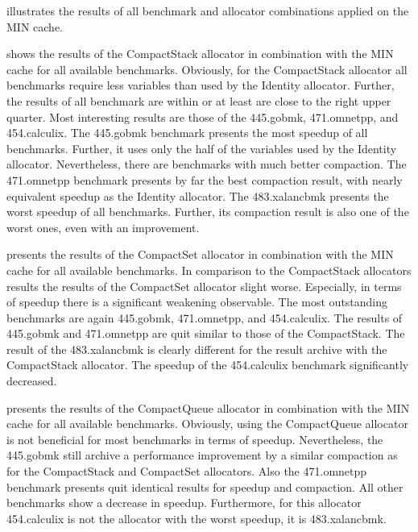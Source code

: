 \documentclass[onecolumn, openright, master, english, signatures]{dbrgrptt}
\begin{document}
 illustrates the results of all benchmark and allocator combinations applied on the \ac{MIN} cache.

 shows the results of the CompactStack allocator in combination with the \ac{MIN} cache for all available benchmarks. Obviously, for the CompactStack allocator all benchmarks require less variables than used by the Identity allocator. Further, the results of all benchmark are within or at least are close to the right upper quarter. Most interesting results are those of the 445.gobmk, 471.omnetpp, and 454.calculix. The 445.gobmk benchmark presents the most speedup of all benchmarks. Further, it uses only the half of the variables used by the Identity allocator. Nevertheless, there are benchmarks with much better compaction. The 471.omnetpp benchmark presents by far the best compaction result, with nearly equivalent speedup as the Identity allocator. The 483.xalancbmk presents the worst speedup of all benchmarks. Further, its compaction result is also one of the worst ones, even with an improvement.

 presents the results of the CompactSet allocator in combination with the \ac{MIN} cache for all available benchmarks. In comparison to the CompactStack allocators results the results of the CompactSet allocator slight worse. Especially, in terms of speedup there is a significant weakening observable. The most outstanding benchmarks are again 445.gobmk, 471.omnetpp, and 454.calculix. The results of 445.gobmk and 471.omnetpp are quit similar to those of the CompactStack. The result of the 483.xalancbmk is clearly different for the result archive with the CompactStack allocator. The speedup of the 454.calculix benchmark significantly decreased.

 presents the results of the CompactQueue allocator in combination with the \ac{MIN} cache for all available benchmarks. Obviously, using the CompactQueue allocator is not beneficial for most benchmarks in terms of speedup. Nevertheless, the 445.gobmk still archive a performance improvement by a similar compaction as for the CompactStack and CompactSet allocators. Also the 471.omnetpp benchmark presents quit identical results for speedup and compaction. All other benchmarks show a decrease in speedup. Furthermore, for this allocator 454.calculix is not the allocator with the worst speedup, it is 483.xalancbmk.
\end{document}
